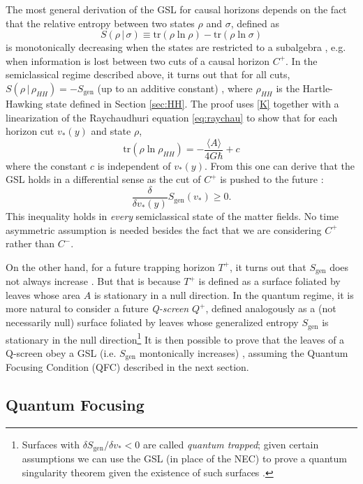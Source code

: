 \documentclass[12pt,a4paper]{article}
\def\be{\begin{equation}}
\def\ee{\end{equation}}
\begin{document}
The most general derivation of the GSL for causal horizons depends on the fact that the relative entropy between two states $\rho$ and $\sigma$, defined as
\be\label{relS}
S(\rho\,|\,\sigma) \equiv \mathrm{tr}(\rho \ln \rho) - \mathrm{tr}(\rho \ln \sigma)
\ee
is monotonically decreasing when the states are restricted to a subalgebra \cite{Araki:1976zv}, e.g. when information is lost between two cuts of a causal horizon $C^+$.  In the semiclassical regime described above, it turns out that for all cuts, $S(\rho\,|\,\rho_{HH}) = -S_\mathrm{gen}$ (up to an additive constant) \cite{wall2011}, where $\rho_{HH}$ is the Hartle-Hawking state  defined in Section \ref{sec:HH}.  The proof uses \eqref{K} together with a linearization of the Raychaudhuri equation \eqref{eq:raychau} to show that for each horizon cut $v_*(y)$ and state $\rho$,
\be
\mathrm{tr}(\rho \ln \rho_{HH}) = -\frac{\langle A \rangle}{4G\hbar} + c
\ee
where the constant $c$ is independent of $v_*(y)$.  From this one can derive that the GSL holds in a differential sense as the cut of $C^+$ is pushed to the future \cite{wall2011}:
\be\label{GSL}
\frac{\delta}{\delta v_*(y)} S_\mathrm{gen}(v_*) \ge 0.
\ee
This inequality holds in \emph{every} semiclassical state of the matter fields.  No time asymmetric assumption is needed besides the fact that we are considering $C^+$ rather than $C^-$.

On the other hand, for a future trapping horizon $T^+$, it turns out that $S_\mathrm{gen}$ does not always increase \cite{wall2011b}.  But that is because $T^+$ is defined as a surface foliated by leaves whose area $A$ is stationary in a null direction.  In the quantum regime, it is more natural to consider a future \emph{Q-screen} $Q^+$, defined analogously as a (not necessarily null) surface foliated by leaves whose generalized entropy $S_\mathrm{gen}$ is stationary in the null direction\footnote{Surfaces with $\delta S_\mathrm{gen}/{\delta v_*} < 0$ are called \emph{quantum trapped}; given certain assumptions we can use the GSL (in place of the NEC) to prove a quantum singularity theorem given the existence of such surfaces \cite{wall2013generalized}.}  It is then possible to prove that the leaves of a Q-screen obey a GSL (i.e. $S_\mathrm{gen}$ montonically increases) \cite{Bousso:2015eda}, assuming the Quantum Focusing Condition (QFC) described in the next section.

\subsection{Quantum Focusing}
\end{document}
